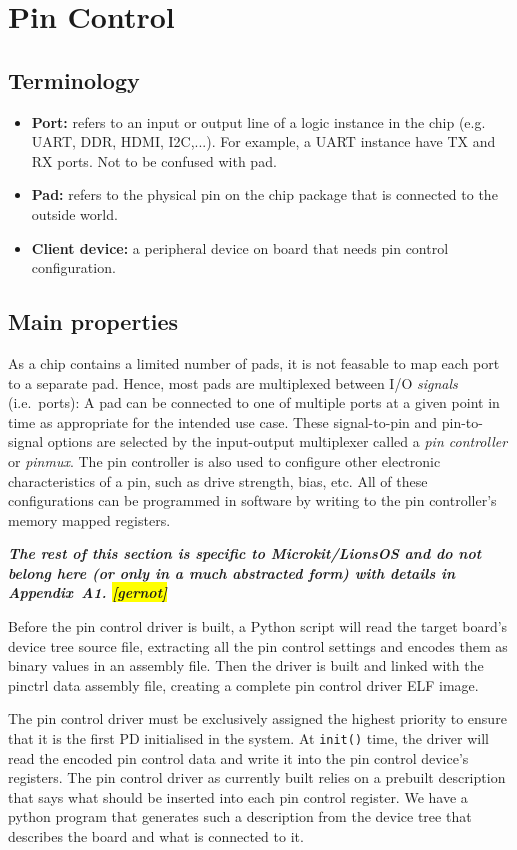 \documentclass[a4paper,12pt]{report}
\newcommand{\Comment}[1]{\textbf{\textsl{#1}}}
\newcommand{\Comment}[1]{\relax}
\newcommand{\gernot}[1]{\Comment{#1 \colorbox{yellow}{[gernot]}}}
\newcommand{\code}[1]{\texttt{#1}}
\begin{document}
\section{Pin Control}\label{s:pins}

\subsection{Terminology}
\begin{itemize}
  \item \textbf{Port:} refers to an input or output line of a logic instance in the chip
    (e.g. UART, DDR, HDMI, I2C,...). For example, a UART instance have TX and RX ports.
    Not to be confused with pad.
  \item \textbf{Pad:} refers to the physical pin on the chip package that is connected to
    the outside world.
  \item \textbf{Client device:} a peripheral device on board that needs pin control configuration.
\end{itemize}

\subsection{Main properties}
As a chip contains a limited number of pads, it is not feasable to map each
port to a separate pad. Hence, most pads are multiplexed between I/O
\emph{signals} (i.e.\ ports):  A pad
can be connected to one of multiple ports at a given point in time as appropriate for the
intended use case. These signal-to-pin and pin-to-signal options are selected by the input-output
multiplexer called a \emph{pin controller} or \emph{pinmux}. The pin controller is also used to configure other
electronic characteristics of a pin, such as drive strength, bias, etc. All of these configurations
can be programmed in software by writing to the pin controller's memory mapped registers.

\iffalse
\gernot{The rest of this section is specific to Microkit/LionsOS and do not
  belong here (or only in a much abstracted form) with details in Appendix~A1.}

Before the pin control driver is built, a Python script will read the target board's device tree
source file, extracting all the pin control settings and encodes them as binary values in an assembly
file. Then the driver is built and linked with the pinctrl data assembly file, creating a complete
pin control driver ELF image.

The pin control driver must be exclusively assigned the highest priority to ensure that it is the first
PD initialised in the system. At \code{init()} time, the driver will read the encoded pin control data and
write it into the pin control device's registers.
\else
The pin control driver as currently built relies on a prebuilt
description that says what should be inserted into each pin control
register.  We have a python program that generates such a description
from the device tree that describes the board and what is connected to
it.
\end{document}

